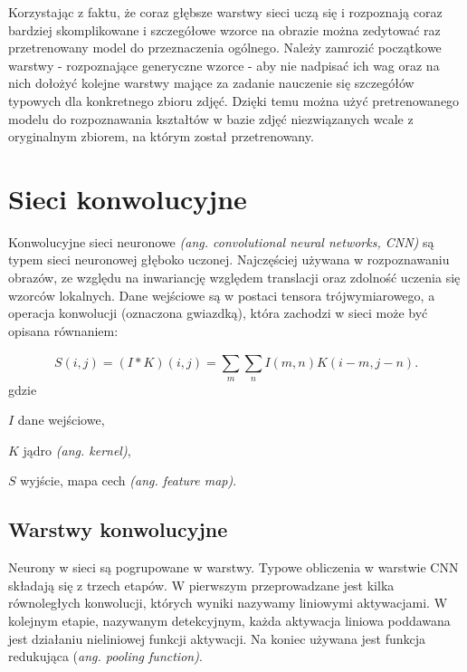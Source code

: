 Korzystając z faktu, że coraz głębsze warstwy sieci uczą się i rozpoznają coraz bardziej skomplikowane i szczegółowe wzorce na obrazie można zedytować raz przetrenowany model do przeznaczenia ogólnego. Należy zamrozić początkowe warstwy - rozpoznające generyczne wzorce - aby nie nadpisać ich wag oraz na nich dołożyć kolejne warstwy mające za zadanie nauczenie się szczegółów typowych dla konkretnego zbioru zdjęć. Dzięki temu można użyć pretrenowanego modelu do rozpoznawania kształtów w bazie zdjęć niezwiązanych wcale z oryginalnym zbiorem, na którym został przetrenowany. 


\section{Sieci konwolucyjne} \label{cnn}
Konwolucyjne sieci neuronowe \textit{(ang. convolutional neural networks, CNN)} są typem sieci neuronowej głęboko uczonej. Najczęściej używana w rozpoznawaniu obrazów, ze względu na inwariancję względem translacji oraz zdolność uczenia się wzorców lokalnych. \cite{Chollet2017DeepLW} Dane wejściowe są w postaci tensora trójwymiarowego, a operacja konwolucji (oznaczona gwiazdką), która zachodzi w sieci może być opisana równaniem: \cite{deep_learning}

\begin{equation}
S(i,j) = (I * K)(i,j) = \sum_{m}^{}\sum_{n}^{} I(m,n)K(i-m,j-n).
\end{equation}
gdzie
\begin{eqwhere}[2cm]
	\item[$I$] dane wejściowe,
	\item[$K$] jądro \textit{(ang. kernel)},
	\item[$S$] wyjście, mapa cech \textit{(ang. feature map)}.
\end{eqwhere}

\subsection{Warstwy konwolucyjne}
Neurony w sieci są pogrupowane w warstwy. Typowe obliczenia w warstwie CNN składają się z trzech etapów. W pierwszym przeprowadzane jest kilka równoległych konwolucji, których wyniki nazywamy liniowymi aktywacjami. W kolejnym etapie, nazywanym detekcyjnym, każda aktywacja liniowa poddawana jest działaniu nieliniowej funkcji aktywacji. Na koniec używana jest funkcja redukująca (\textit{ang. pooling function)}. \cite{deep_learning}

